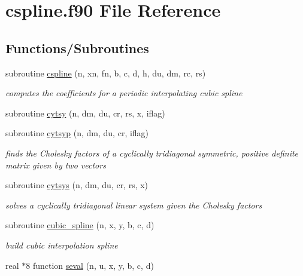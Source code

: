 \hypertarget{cspline_8f90}{\section{cspline.\-f90 File Reference}
\label{cspline_8f90}
}
\subsection*{Functions/\-Subroutines}
\begin{DoxyCompactItemize}
\item 
subroutine \hyperlink{cspline_8f90_aa126df16eef00c1ff89721e8842bc50d}{cspline} (n, xn, fn, b, c, d, h, du, dm, rc, rs)
\begin{DoxyCompactList}\small\item\em computes the coefficients for a periodic interpolating cubic spline \end{DoxyCompactList}\item 
subroutine \hyperlink{cspline_8f90_ae71f605309ec2714e6fd01714ba03145}{cytsy} (n, dm, du, cr, rs, x, iflag)
\item 
subroutine \hyperlink{cspline_8f90_ac9b0a6151db99c878eb754f1587d0ee3}{cytsyp} (n, dm, du, cr, iflag)
\begin{DoxyCompactList}\small\item\em finds the Cholesky factors of a cyclically tridiagonal symmetric, positive definite matrix given by two vectors \end{DoxyCompactList}\item 
subroutine \hyperlink{cspline_8f90_a2d98707bbafe1e3af7aedbe3b5b412e9}{cytsys} (n, dm, du, cr, rs, x)
\begin{DoxyCompactList}\small\item\em solves a cyclically tridiagonal linear system given the Cholesky factors \end{DoxyCompactList}\item 
subroutine \hyperlink{cspline_8f90_a9738ad86267fcd52bd20d20b2f8f8b67}{cubic\-\_\-spline} (n, x, y, b, c, d)
\begin{DoxyCompactList}\small\item\em build cubic interpolation spline \end{DoxyCompactList}\item 
real $\ast$8 function \hyperlink{cspline_8f90_aec7a478fe945a484dab86fb915cb1185}{seval} (n, u, x, y, b, c, d)
\end{DoxyCompactItemize}


